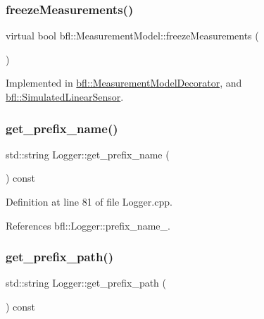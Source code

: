 \subsubsection{\texorpdfstring{freeze\+Measurements()}{freezeMeasurements()}}
{\footnotesize\ttfamily virtual bool bfl\+::\+Measurement\+Model\+::freeze\+Measurements (\begin{DoxyParamCaption}{ }\end{DoxyParamCaption})\hspace{0.3cm}{\ttfamily [pure virtual]}}



Implemented in \mbox{\hyperlink{classbfl_1_1MeasurementModelDecorator_a17d5fb12bfa048ca56160f745f112e32}{bfl\+::\+Measurement\+Model\+Decorator}}, and \mbox{\hyperlink{classbfl_1_1SimulatedLinearSensor_a683f147d792a79c5ad4c6746210dfdee}{bfl\+::\+Simulated\+Linear\+Sensor}}.

\mbox{\label{classbfl_1_1Logger_a913a795b7bfbf378815eeb342d68a7c0}} 
\subsubsection{\texorpdfstring{get\+\_\+prefix\+\_\+name()}{get\_prefix\_name()}}
{\footnotesize\ttfamily std\+::string Logger\+::get\+\_\+prefix\+\_\+name (\begin{DoxyParamCaption}{ }\end{DoxyParamCaption}) const\hspace{0.3cm}{\ttfamily [inherited]}}



Definition at line 81 of file Logger.\+cpp.



References bfl\+::\+Logger\+::prefix\+\_\+name\+\_\+.

\mbox{\label{classbfl_1_1Logger_a56cf1a4e712bf23d9978420a8a59a62b}} 
\subsubsection{\texorpdfstring{get\+\_\+prefix\+\_\+path()}{get\_prefix\_path()}}
{\footnotesize\ttfamily std\+::string Logger\+::get\+\_\+prefix\+\_\+path (\begin{DoxyParamCaption}{ }\end{DoxyParamCaption}) const\hspace{0.3cm}{\ttfamily [inherited]}}



